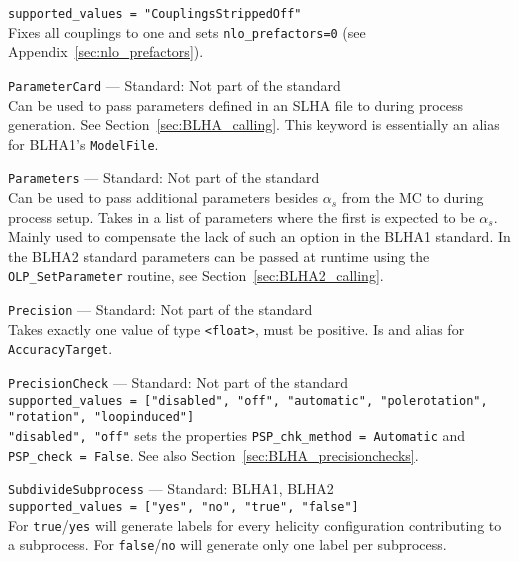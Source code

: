 \begin{basedescript}{\desclabelstyle{\pushlabel}}
        \lstinline[style=in]|supported_values = "CouplingsStrippedOff"|\\
        Fixes all couplings to one and sets \lstinline[style=in]|nlo_prefactors=0| (see Appendix~\ref{sec:nlo_prefactors}).
     \item[\hspace{-1em}]\colorbox{gray!30}{\lstinline[style=in]|ParameterCard|} --- Standard: Not part of the standard\vspace{0.1cm}\\
        Can be used to pass parameters defined in an SLHA file to \gosam during process generation. See Section~\ref{sec:BLHA_calling}. This keyword is essentially an alias for BLHA1's \lstinline[style=in]|ModelFile|.
    \item[\hspace{-1em}]\colorbox{gray!30}{\lstinline[style=in]|Parameters|} --- Standard: Not part of the standard\vspace{0.1cm}\\
        Can be used to pass additional parameters besides $\alpha_s$ from the MC to \gosam during process setup. Takes in a list of parameters where the first is expected to be $\alpha_s$. Mainly used to compensate the lack of such an option in the BLHA1 standard. In the BLHA2 standard parameters can be passed at runtime using the \texttt{OLP\_SetParameter} routine, see Section~\ref{sec:BLHA2_calling}.
    \item[\hspace{-1em}]\colorbox{gray!30}{\lstinline[style=in]|Precision|} --- Standard: Not part of the standard\vspace{0.1cm}\\
        Takes exactly one value of type \texttt{<float>}, must be positive. Is and alias for \texttt{AccuracyTarget}.
    \item[\hspace{-1em}]\colorbox{gray!30}{\lstinline[style=in]|PrecisionCheck|} --- Standard: Not part of the standard\vspace{0.1cm}\\
        \lstinline[style=in]|supported_values = ["disabled", "off", "automatic", "polerotation", "rotation", "loopinduced"]|\\
        \lstinline[style=in]|"disabled", "off"| sets the properties \lstinline[style=in]|PSP_chk_method = Automatic| and  \lstinline[style=in]|PSP_check = False|. See also Section~\ref{sec:BLHA_precisionchecks}.
    \item[\hspace{-1em}]\colorbox{gray!30}{\lstinline[style=in]|SubdivideSubprocess|} --- Standard: BLHA1, BLHA2\vspace{0.1cm}\\
        \lstinline[style=in]|supported_values = ["yes", "no", "true", "false"]|\\
        For \texttt{true}/\texttt{yes} \gosam will generate labels for every helicity configuration contributing to a subprocess. For \texttt{false}/\texttt{no} \gosam will generate only one label per subprocess.
\end{basedescript}

